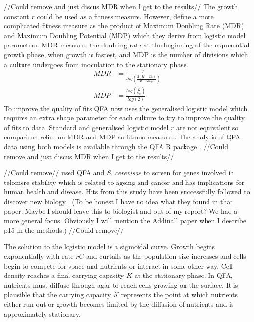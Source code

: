 //Could remove and just discus MDR when I get to the results//
The growth constant \(r\) could be used as a fitness measure. However,
\citet{Addinall2011} define a more complicated fitness measure as the
product of Maximum Doubling Rate (MDR) and Maximum Doubling Potential
(MDP) which they derive from logistic model parameters. MDR measures
the doubling rate at the beginning of the exponential growth phase,
when growth is fastest, and MDP is the number of divisions which a
culture undergoes from inoculation to the stationary phase.
%
\begin{subequations}
  \label{eq:MDR_MDP}
    \begin{align}
      MDR &= \frac{r}{log\left(\frac{2(K-C_0)}{K-2C_0}\right)}\\
      MDP &= \frac{log\left(\frac{K}{C_0}\right)}{log(2)}
    \end{align}
\end{subequations}
%
To improve the quality of fits QFA now uses the generalised logistic
model which requires an extra shape parameter for each culture to try
to improve the quality of fits to data. Standard and generalised
logistic model \(r\) are not equivalent so comparison relies on MDR
and MDP as fitness measures. The analysis of QFA data using both
models is available through the QFA R package \citep{qfa2016}.
//Could remove and just discus MDR when I get to the results//


//Could remove//
\citet{Addinall2011} used QFA and \textit{S. cerevisae} to screen for
genes involved in telomere stability which is related to ageing and
cancer and has implications for human health and disease. Hits from
this study have been successfully followed to discover new biology
\citep{Holstein20141259}. (To be honest I have no idea what they found
in that paper. Maybe I should leave this to biologist and out of my
report? We had a more general focus. Obviously I will mention the
Addinall paper when I describe p15 in the methods.)
//Could remove//




The solution to the logistic model is a sigmoidal curve. Growth begins
exponentially with rate \(rC\) and curtails as the population size
increases and cells begin to compete for space and nutrients or
interact in some other way. Cell density reaches a final carrying
capacity \(K\) at the stationary phase. In QFA, nutrients must diffuse
through agar to reach cells growing on the surface. It is plausible
that the carrying capacity \(K\) represents the point at which
nutrients either run out or growth becomes limited by the diffusion of
nutrients and is approximately stationary.

